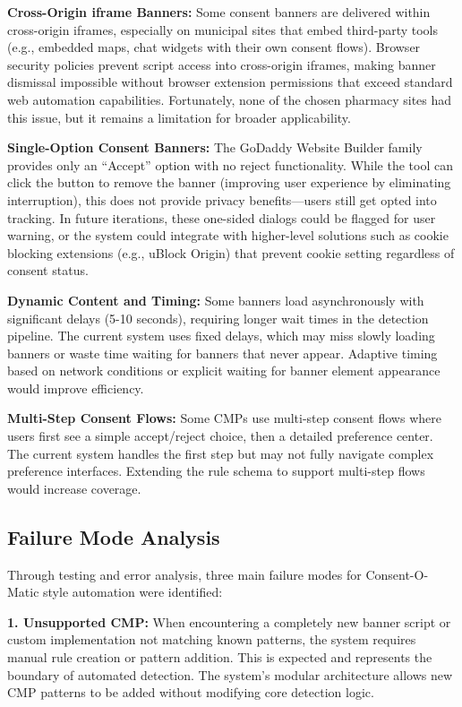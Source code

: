 \documentclass[conference]{IEEEtran}
\begin{document}
\textbf{Cross-Origin iframe Banners:} Some consent banners are delivered within cross-origin iframes, especially on municipal sites that embed third-party tools (e.g., embedded maps, chat widgets with their own consent flows). Browser security policies prevent script access into cross-origin iframes, making banner dismissal impossible without browser extension permissions that exceed standard web automation capabilities. Fortunately, none of the chosen pharmacy sites had this issue, but it remains a limitation for broader applicability.

\textbf{Single-Option Consent Banners:} The GoDaddy Website Builder family provides only an ``Accept'' option with no reject functionality. While the tool can click the button to remove the banner (improving user experience by eliminating interruption), this does not provide privacy benefits—users still get opted into tracking. In future iterations, these one-sided dialogs could be flagged for user warning, or the system could integrate with higher-level solutions such as cookie blocking extensions (e.g., uBlock Origin) that prevent cookie setting regardless of consent status.

\textbf{Dynamic Content and Timing:} Some banners load asynchronously with significant delays (5-10 seconds), requiring longer wait times in the detection pipeline. The current system uses fixed delays, which may miss slowly loading banners or waste time waiting for banners that never appear. Adaptive timing based on network conditions or explicit waiting for banner element appearance would improve efficiency.

\textbf{Multi-Step Consent Flows:} Some CMPs use multi-step consent flows where users first see a simple accept/reject choice, then a detailed preference center. The current system handles the first step but may not fully navigate complex preference interfaces. Extending the rule schema to support multi-step flows would increase coverage.

\subsection{Failure Mode Analysis}

Through testing and error analysis, three main failure modes for Consent-O-Matic style automation were identified:

\textbf{1. Unsupported CMP:} When encountering a completely new banner script or custom implementation not matching known patterns, the system requires manual rule creation or pattern addition. This is expected and represents the boundary of automated detection. The system's modular architecture allows new CMP patterns to be added without modifying core detection logic.
\end{document}
